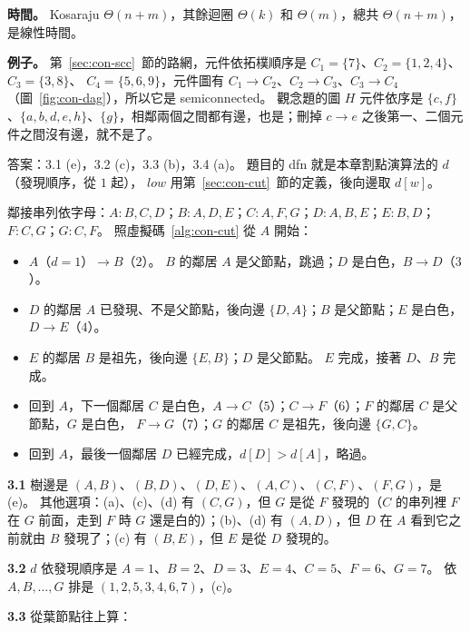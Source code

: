 \textbf{時間。} Kosaraju $\Theta(n + m)$，其餘迴圈 $\Theta(k)$ 和 $\Theta(m)$，總共 $\Theta(n + m)$，是線性時間。

\textbf{例子。} 第~\ref{sec:con-scc}~節的路網，元件依拓樸順序是 $C_1 = \{7\}$、$C_2 = \{1, 2, 4\}$、$C_3 = \{3, 8\}$、
$C_4 = \{5, 6, 9\}$，元件圖有 $C_1 \to C_2$、$C_2 \to C_3$、$C_3 \to C_4$（圖~\ref{fig:con-dag}），所以它是
semiconnected。 觀念題的圖 $H$ 元件依序是 $\{c, f\}$、$\{a, b, d, e, h\}$、$\{g\}$，相鄰兩個之間都有邊，也是；刪掉
$c \to e$ 之後第一、二個元件之間沒有邊，就不是了。

答案：3.1 (e)，3.2 (c)，3.3 (b)，3.4 (a)。 題目的 dfn 就是本章割點演算法的 $d$（發現順序，從 $1$ 起），
$\mathit{low}$ 用第~\ref{sec:con-cut}~節的定義，後向邊取 $d[w]$。

鄰接串列依字母：$A\colon B, C, D$；$B\colon A, D, E$；$C\colon A, F, G$；$D\colon A, B, E$；$E\colon B, D$；
$F\colon C, G$；$G\colon C, F$。 照虛擬碼~\ref{alg:con-cut} 從 $A$ 開始：
\begin{itemize}
\item $A$（$d = 1$）$\to B$（$2$）。 $B$ 的鄰居 $A$ 是父節點，跳過；$D$ 是白色，$B \to D$（$3$）。
\item $D$ 的鄰居 $A$ 已發現、不是父節點，後向邊 $\{D, A\}$；$B$ 是父節點；$E$ 是白色，$D \to E$（$4$）。
\item $E$ 的鄰居 $B$ 是祖先，後向邊 $\{E, B\}$；$D$ 是父節點。 $E$ 完成，接著 $D$、$B$ 完成。
\item 回到 $A$，下一個鄰居 $C$ 是白色，$A \to C$（$5$）；$C \to F$（$6$）；$F$ 的鄰居 $C$ 是父節點，$G$ 是白色，
$F \to G$（$7$）；$G$ 的鄰居 $C$ 是祖先，後向邊 $\{G, C\}$。
\item 回到 $A$，最後一個鄰居 $D$ 已經完成，$d[D] > d[A]$，略過。
\end{itemize}

\textbf{3.1} 樹邊是 $(A, B)$、$(B, D)$、$(D, E)$、$(A, C)$、$(C, F)$、$(F, G)$，是 (e)。 其他選項：(a)、(c)、(d)
有 $(C, G)$，但 $G$ 是從 $F$ 發現的（$C$ 的串列裡 $F$ 在 $G$ 前面，走到 $F$ 時 $G$ 還是白的）；(b)、(d) 有
$(A, D)$，但 $D$ 在 $A$ 看到它之前就由 $B$ 發現了；(c) 有 $(B, E)$，但 $E$ 是從 $D$ 發現的。

\textbf{3.2} $d$ 依發現順序是 $A = 1$、$B = 2$、$D = 3$、$E = 4$、$C = 5$、$F = 6$、$G = 7$。 依 $A, B, \ldots, G$
排是 $(1, 2, 5, 3, 4, 6, 7)$，(c)。

\textbf{3.3} 從葉節點往上算：

